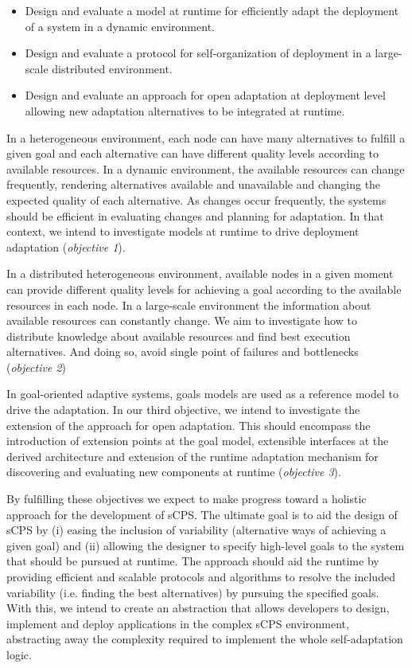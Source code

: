 \begin{itemize}
  \item Design and evaluate a model at runtime for efficiently adapt the deployment of a system in a dynamic environment. 
  \item Design and evaluate a protocol for self-organization of deployment in a large-scale distributed environment.
  \item Design and evaluate an approach for open adaptation at deployment level allowing new adaptation alternatives to be integrated at runtime.   
\end{itemize}


In a heterogeneous environment, each node can have many alternatives to fulfill a given goal and each alternative can have different quality levels according to available resources. In a dynamic environment, the available resources can change frequently, rendering alternatives available and unavailable and changing the expected quality of each alternative. As changes occur frequently, the systems should be efficient in evaluating changes and planning for adaptation. In that context, we intend to investigate models at runtime to drive deployment adaptation (\emph{objective 1}).

In a distributed heterogeneous environment, available nodes in a given moment can provide different quality levels for achieving a goal according to the available resources in each node. In a large-scale environment the information about available resources can constantly change. We aim to investigate how to distribute knowledge about available resources and find best execution alternatives. And doing so, avoid single point of failures and bottlenecks (\emph{objective 2})

In goal-oriented adaptive systems, goals models are used as a reference model to drive the adaptation. In our third objective, we intend to investigate the extension of the approach for open adaptation. This should encompass the introduction of extension points at the goal model, extensible interfaces at the derived architecture and extension of the runtime adaptation mechanism for discovering and evaluating new components at runtime (\emph{objective 3}). 

By fulfilling these objectives we expect to make progress toward a holistic approach for the development of sCPS. The ultimate goal is to aid the design of sCPS by (i) easing the inclusion of variability (alternative ways of achieving a given goal) and (ii) allowing the designer to specify high-level goals to the system that should be pursued at runtime. The approach should aid the runtime by providing efficient and scalable protocols and algorithms to resolve the included variability (i.e. finding the best alternatives) by pursuing the specified goals. With this, we intend to create an abstraction that allows developers to design, implement and deploy applications in the complex sCPS environment, abstracting away the complexity required to implement the whole self-adaptation logic.

